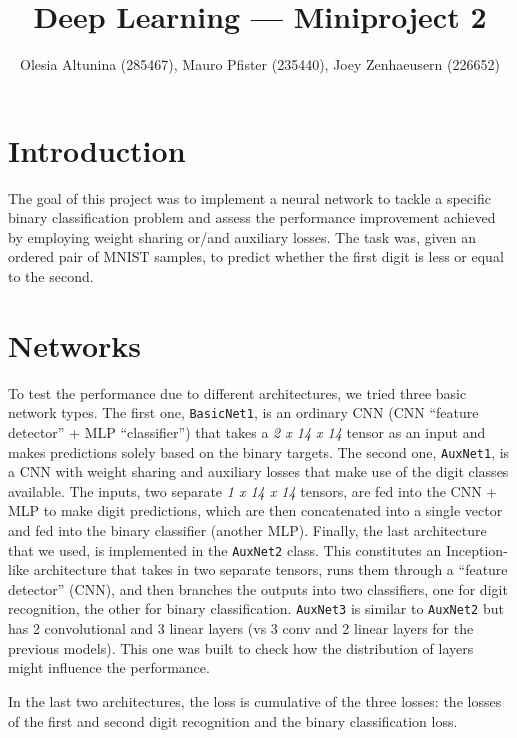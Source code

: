 \documentclass[10pt,conference,compsocconf]{IEEEtran}
\begin{document}
\title{Deep Learning --- Miniproject 2}

\author{
  Olesia Altunina (285467), Mauro Pfister (235440), Joey Zenhaeusern (226652)
}

\maketitle

\section{Introduction}
The goal of this project was to implement a neural network to tackle a specific binary classification problem and assess the performance improvement achieved by employing weight sharing or/and auxiliary losses. The task was, given an ordered pair of MNIST samples, to predict whether the first digit is less or equal to the second.

\section{Networks}
To test the performance due to different architectures, we tried three basic network types. The first one, \texttt{BasicNet1}, is an ordinary CNN (CNN “feature detector” + MLP “classifier”) that takes a \textit{2 x 14 x 14} tensor as an input and makes predictions solely based on the binary targets. The second one, \texttt{AuxNet1}, is a CNN with weight sharing and auxiliary losses that make use of the digit classes available. The inputs, two separate \textit{1 x 14 x 14} tensors, are fed into the CNN + MLP to make digit predictions, which are then concatenated into a single vector and fed into the binary classifier (another MLP). Finally, the last architecture that we used, is implemented in the \texttt{AuxNet2} class. This constitutes an Inception-like architecture that takes in two separate tensors, runs them through a “feature detector” (CNN), and then branches the outputs into two classifiers, one for digit recognition, the other for binary classification.
\texttt{AuxNet3} is similar to \texttt{AuxNet2} but has 2 convolutional and 3 linear layers (vs 3 conv and 2 linear layers for the previous models). This one was built to check how the distribution of layers might influence the performance.

In the last two architectures, the loss is cumulative of the three losses: the losses of the first and second digit recognition and the binary classification loss.
\end{document}
